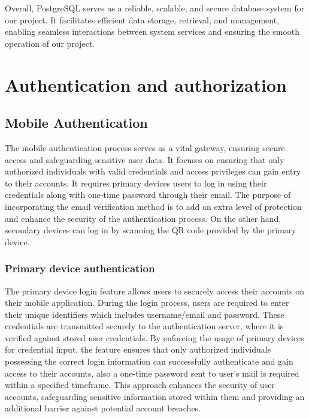 \documentclass[
12pt,
oneside, 
onehalfspacing, 
nolistspacing, 
parskip, 
chapterinoneline, 
]{AASTCOMPUTER}
\begin{document}
Overall, PostgreSQL serves as a reliable, scalable, and secure database system for our project. It facilitates efficient data storage, retrieval, and management, enabling seamless interactions between system services and ensuring the smooth operation of our project.

\section{Authentication and authorization}

\subsection{Mobile Authentication}
The mobile authentication process serves as a vital gateway, ensuring secure access and safeguarding sensitive user data. It focuses on ensuring that only authorized individuals with valid credentials and access privileges can gain entry to their accounts. It requires primary devices users to log in using their credentials along with one-time password through their email. The purpose of incorporating the email verification method is to add an extra level of protection and enhance the security of the authentication process. On the other hand, secondary devices can log in by scanning the QR code provided by the primary device.

\subsubsection{Primary device authentication}
The primary device login feature allows users to securely access their accounts on their mobile application. During the login process, users are required to enter their unique identifiers which includes username/email and password. These credentials are transmitted securely to the authentication server, where it is verified against stored user credentials. By enforcing the usage of primary devices for credential input, the feature ensures that only authorized individuals possessing the correct login information can successfully authenticate and gain access to their accounts, also a one-time password sent to user’s mail is required within a specified timeframe. This approach enhances the security of user accounts, safeguarding sensitive information stored within them and providing an additional barrier against potential account breaches.
\end{document}
